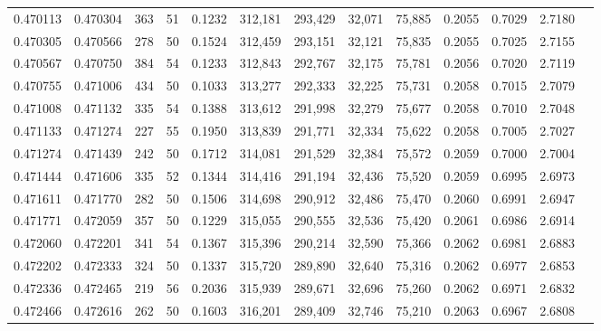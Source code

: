 \begin{tabular}{rrrrrrrrrrrrr}
0.470113 & 0.470304 &   363 &  51 &                                     0.1232 & 312,181 & 293,429 &  32,071 &  75,885 & 0.2055 & 0.7029 & 2.7180 \\
0.470305 & 0.470566 &   278 &  50 &                                     0.1524 & 312,459 & 293,151 &  32,121 &  75,835 & 0.2055 & 0.7025 & 2.7155 \\
0.470567 & 0.470750 &   384 &  54 &                                     0.1233 & 312,843 & 292,767 &  32,175 &  75,781 & 0.2056 & 0.7020 & 2.7119 \\
0.470755 & 0.471006 &   434 &  50 &                                     0.1033 & 313,277 & 292,333 &  32,225 &  75,731 & 0.2058 & 0.7015 & 2.7079 \\
0.471008 & 0.471132 &   335 &  54 &                                     0.1388 & 313,612 & 291,998 &  32,279 &  75,677 & 0.2058 & 0.7010 & 2.7048 \\
0.471133 & 0.471274 &   227 &  55 &                                     0.1950 & 313,839 & 291,771 &  32,334 &  75,622 & 0.2058 & 0.7005 & 2.7027 \\
0.471274 & 0.471439 &   242 &  50 &                                     0.1712 & 314,081 & 291,529 &  32,384 &  75,572 & 0.2059 & 0.7000 & 2.7004 \\
0.471444 & 0.471606 &   335 &  52 &                                     0.1344 & 314,416 & 291,194 &  32,436 &  75,520 & 0.2059 & 0.6995 & 2.6973 \\
0.471611 & 0.471770 &   282 &  50 &                                     0.1506 & 314,698 & 290,912 &  32,486 &  75,470 & 0.2060 & 0.6991 & 2.6947 \\
0.471771 & 0.472059 &   357 &  50 &                                     0.1229 & 315,055 & 290,555 &  32,536 &  75,420 & 0.2061 & 0.6986 & 2.6914 \\
0.472060 & 0.472201 &   341 &  54 &                                     0.1367 & 315,396 & 290,214 &  32,590 &  75,366 & 0.2062 & 0.6981 & 2.6883 \\
0.472202 & 0.472333 &   324 &  50 &                                     0.1337 & 315,720 & 289,890 &  32,640 &  75,316 & 0.2062 & 0.6977 & 2.6853 \\
0.472336 & 0.472465 &   219 &  56 &                                     0.2036 & 315,939 & 289,671 &  32,696 &  75,260 & 0.2062 & 0.6971 & 2.6832 \\
0.472466 & 0.472616 &   262 &  50 &                                     0.1603 & 316,201 & 289,409 &  32,746 &  75,210 & 0.2063 & 0.6967 & 2.6808 \\

\end{tabular}
